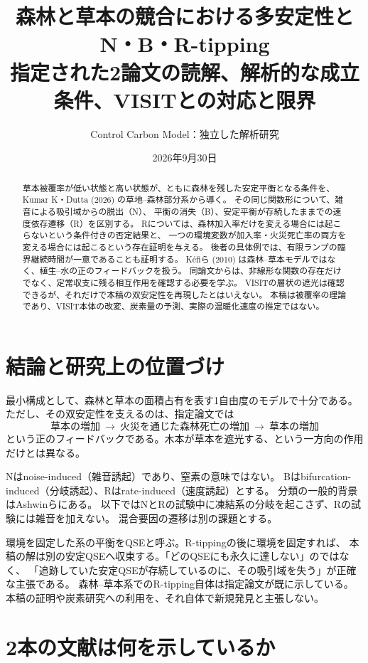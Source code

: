 \documentclass[a4paper,11pt]{ltjsarticle}
\title{森林と草本の競合における多安定性とN・B・R-tipping\\
\large 指定された2論文の読解、解析的な成立条件、VISITとの対応と限界}
\author{Control Carbon Model：独立した解析研究}
\date{2026年9月30日}
\begin{document}
\maketitle
\begin{abstract}
草本被覆率が低い状態と高い状態が、ともに森林を残した安定平衡となる条件を、
Kumar K・Dutta (2026) の草地--森林部分系から導く。
その同じ関数形について、雑音による吸引域からの脱出（N）、
平衡の消失（B）、安定平衡が存続したままでの速度依存遷移（R）を区別する。
Rについては、森林加入率だけを変える場合には起こらないという条件付きの否定結果と、
一つの環境変数が加入率・火災死亡率の両方を変える場合には起こるという存在証明を与える。
後者の具体例では、有限ランプの臨界継続時間が一意であることも証明する。
Kéfiら (2010) は森林--草本モデルではなく、植生--水の正のフィードバックを扱う。
同論文からは、非線形な関数の存在だけでなく、定常収支に残る相互作用を確認する必要を学ぶ。
VISITの層状の遮光は確認できるが、それだけで本稿の双安定性を再現したとはいえない。
本稿は被覆率の理論であり、VISIT本体の改変、炭素量の予測、実際の温暖化速度の推定ではない。
\end{abstract}
\tableofcontents

\section{結論と研究上の位置づけ}
最小構成として、森林と草本の面積占有を表す1自由度のモデルで十分である。
ただし、その双安定性を支えるのは、指定論文では
\[
\text{草本の増加}\ \longrightarrow\
\text{火災を通じた森林死亡の増加}\ \longrightarrow\
\text{草本の増加}
\]
という正のフィードバックである。木本が草本を遮光する、という一方向の作用だけとは異なる。

Nはnoise-induced（雑音誘起）であり、窒素の意味ではない。
Bはbifurcation-induced（分岐誘起）、Rはrate-induced（速度誘起）とする。
分類の一般的背景はAshwinら\cite{ashwin}にある。
以下ではNとRの試験中に凍結系の分岐を起こさず、Rの試験には雑音を加えない。
混合要因の遷移は別の課題とする。

環境を固定した系の平衡をQSEと呼ぶ。R-tippingの後に環境を固定すれば、
本稿の解は別の安定QSEへ収束する。「どのQSEにも永久に達しない」のではなく、
「追跡していた安定QSEが存続しているのに、その吸引域を失う」が正確な主張である。
森林--草本系でのR-tipping自体は指定論文\cite{kumar}が既に示している。
本稿の証明や炭素研究への利用を、それ自体で新規発見と主張しない。

\section{2本の文献は何を示しているか}
\end{document}
